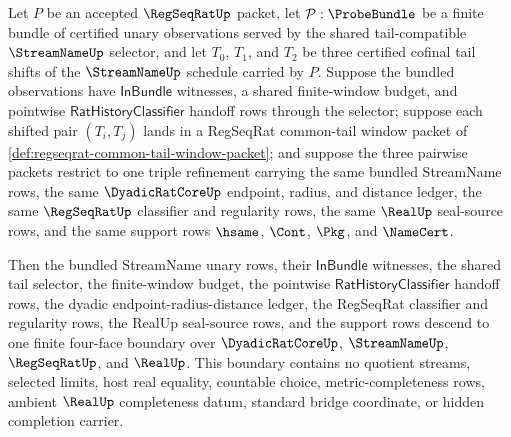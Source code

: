\begin{theorem}
\label{thm:regseqrat-common-tail-cofinal-bundle-four-face-descent}
Let $P$ be an accepted $\RegSeqRatUp$ packet, let $\mathcal P:\ProbeBundle$ be a finite bundle of certified unary observations served by the shared tail-compatible $\StreamNameUp$ selector, and let $T_0$, $T_1$, and $T_2$ be three certified cofinal tail shifts of the $\StreamNameUp$ schedule carried by $P$. Suppose the bundled observations have $\mathsf{InBundle}$ witnesses, a shared finite-window budget, and pointwise $\mathsf{RatHistoryClassifier}$ handoff rows through the selector; suppose each shifted pair $(T_i,T_j)$ lands in a RegSeqRat common-tail window packet of \autoref{def:regseqrat-common-tail-window-packet}; and suppose the three pairwise packets restrict to one triple refinement carrying the same bundled StreamName rows, the same $\DyadicRatCoreUp$ endpoint, radius, and distance ledger, the same $\RegSeqRatUp$ classifier and regularity rows, the same $\RealUp$ seal-source rows, and the same support rows $\hsame$, $\Cont$, $\Pkg$, and $\NameCert$.

Then the bundled StreamName unary rows, their $\mathsf{InBundle}$ witnesses, the shared tail selector, the finite-window budget, the pointwise $\mathsf{RatHistoryClassifier}$ handoff rows, the dyadic endpoint-radius-distance ledger, the RegSeqRat classifier and regularity rows, the RealUp seal-source rows, and the support rows descend to one finite four-face boundary over $\DyadicRatCoreUp$, $\StreamNameUp$, $\RegSeqRatUp$, and $\RealUp$. This boundary contains no quotient streams, selected limits, host real equality, countable choice, metric-completeness rows, ambient $\RealUp$ completeness datum, standard bridge coordinate, or hidden completion carrier.
\end{theorem}
